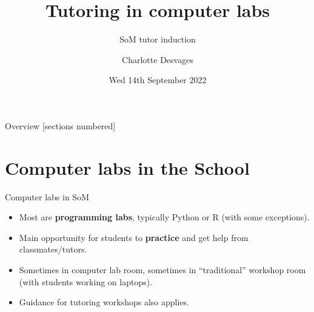 \documentclass[10pt]{beamer}
\title{Tutoring in computer labs}
\subtitle{SoM tutor induction}
\date{Wed 14th September 2022}
\author{Charlotte Desvages}
\institute{School of Mathematics}
\begin{document}

\maketitle

\begin{frame}{Overview}
  [sections numbered]
  \tableofcontents%
\end{frame}

\section{Computer labs in the School}

\begin{frame}[fragile]{Computer labs in SoM}

    \begin{itemize}[<+->]
        \item Most are \textbf{programming labs}, typically Python or R (with some exceptions).
        \item Main opportunity for students to \textbf{practice} and get help from classmates/tutors.
        \item Sometimes in computer lab room, sometimes in ``traditional'' workshop room (with students working on laptops).
        \item Guidance for tutoring workshops also applies.
    \end{itemize}

\end{frame}
\end{document}
